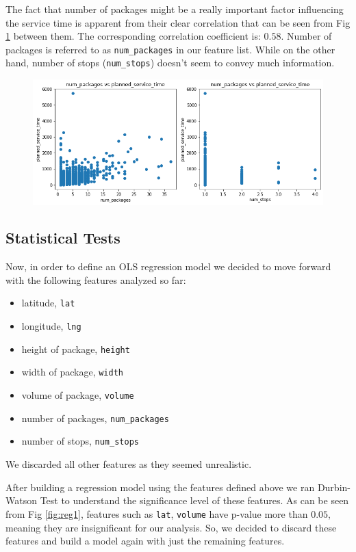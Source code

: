 \documentclass[12pt]{article}
\theoremstyle{plain}
\numberwithin{equation}{section}
\begin{document}
The fact that number of packages might be a really important factor influencing the service time is apparent from their clear correlation that can be seen from Fig \ref{fig:num_packages_scatter} between them. The corresponding correlation coefficient is: $0.58$. Number of packages is referred to as \texttt{num\_packages} in our feature list. While on the other hand, number of stops (\texttt{num\_stops}) doesn't seem to convey much information.


\begin{figure}
\centering
\includegraphics[width=18cm]{Images/num_packages_scatter.png}
\caption{}
\label{fig:num_packages_scatter}
\end{figure}


\subsection{Statistical Tests}

Now, in order to define an OLS regression model we decided to move forward with the following features analyzed so far:
\begin{itemize}
    \item latitude, \texttt{lat}
    \item longitude, \texttt{lng}
    \item height of package, \texttt{height}
    \item width of package,  \texttt{width}
    \item volume of package, \texttt{volume}
    \item number of packages, \texttt{num\_packages}
    \item number of stops, \texttt{num\_stops}
\end{itemize}We discarded all other features as they seemed unrealistic.


After building a regression model using the features defined above we ran Durbin-Watson Test to understand the significance level of these features. As can be seen from Fig \ref{fig:reg1}, features such as \texttt{lat}, \texttt{volume} have p-value more than $0.05$, meaning they are insignificant for our analysis. So, we decided to discard these features and build a model again with just the remaining features.
\end{document}
